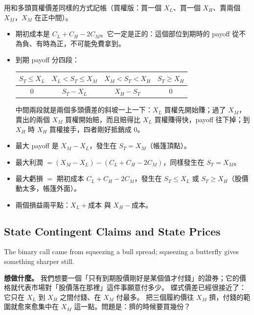 \suppstart
\begin{remark}
	用和多頭買權價差同樣的方式記帳（買權版：買一個 $X_{L}$、買一個 $X_{H}$、賣兩個 $X_{M}$，$X_{M}$ 在正中間）。
	\begin{itemize}[itemsep=0.3em]
		\item 期初成本是 $C_{L}+C_{H}-2C_{M}$。它一定是正的：這個部位到期時的 payoff 從不為負、有時為正，不可能免費拿到。
		\item 到期 payoff 分四段：
		      \begin{center}
		      	\begin{tabular}{@{}cccc@{}}
		      		\toprule
		      		$S_{T}\le X_{L}$ & $X_{L}<S_{T}\le X_{M}$ & $X_{M}<S_{T}<X_{H}$ & $S_{T}\ge X_{H}$ \\
		      		\midrule
		      		$0$              & $S_{T}-X_{L}$          & $X_{H}-S_{T}$       & $0$              \\
		      		\bottomrule
		      	\end{tabular}
		      \end{center}
		      中間兩段就是兩個多頭價差的斜坡一上一下：$X_{L}$ 買權先開始賺；過了 $X_{M}$，賣出的兩個 $X_{M}$ 買權開始賠，而且賠得比 $X_{L}$ 買權賺得快，payoff 往下掉；到 $X_{H}$ 時 $X_{H}$ 買權接手，四者剛好抵銷成 $0$。
		\item 最大 payoff 是 $X_{M}-X_{L}$，發生在 $S_{T}=X_{M}$（帳篷頂點）。
		\item 最大利潤 $=(X_{M}-X_{L})-(C_{L}+C_{H}-2C_{M})$，同樣發生在 $S_{T}=X_{M}$。
		\item 最大虧損 $=$ 期初成本 $C_{L}+C_{H}-2C_{M}$，發生在 $S_{T}\le X_{L}$ 或 $S_{T}\ge X_{H}$（股價動太多，帳篷外面）。
		\item 兩個損益兩平點：$X_{L}+\text{成本}$ 與 $X_{H}-\text{成本}$。
	\end{itemize}
\end{remark}
\suppend

\subsection{State Contingent Claims and State Prices}
\label{sec:state-claims}


The binary call came from squeezing a bull spread; squeezing a butterfly gives something sharper still.

\suppstart
\textbf{想做什麼。}
我們想要一個「只有到期股價剛好是某個值才付錢」的證券；它的價格就代表市場對「股價落在那裡」這件事願意付多少。
蝶式價差已經很接近了：它只在 $X_{L}$ 到 $X_{H}$ 之間付錢、在 $X_{M}$ 付最多。
把三個履約價往 $X_{M}$ 擠，付錢的範圍就愈來愈集中在 $X_{M}$ 這一點。問題是：擠的時候要買幾份？

